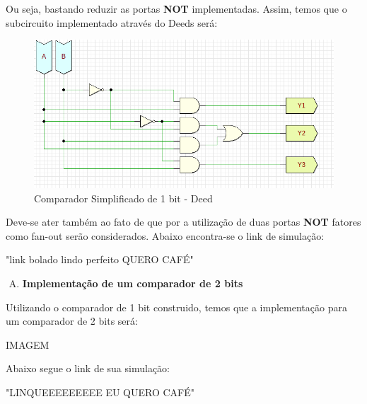 \documentclass[12pt]{article}
\begin{document}
Ou seja, bastando reduzir as portas \textbf{NOT} implementadas. Assim, temos que o subcircuito implementado através do Deeds será:

\begin{figure}[H]
    \centering
    \includegraphics[width=.9\textwidth]{Exp04/Exp4.2.2.2.png}
    \caption{Comparador Simplificado de 1 bit - Deed}\label{fig:Comparador1Bit.png}
\end{figure}

Deve-se ater também ao fato de que por a utilização de duas portas \textbf{NOT} fatores como fan-out serão considerados.
Abaixo encontra-se o link de simulação:

"link bolado lindo perfeito QUERO CAFÉ"

\begin{enumerate}[C)]
\item \textbf{Implementação de um comparador de 2 bits}
\end{enumerate}

Utilizando o comparador de 1 bit construido, temos que a implementação para um comparador de 2 bits será:

IMAGEM

Abaixo segue o link de sua simulação:

"LINQUEEEEEEEEE EU QUERO CAFÉ"
\end{document}
